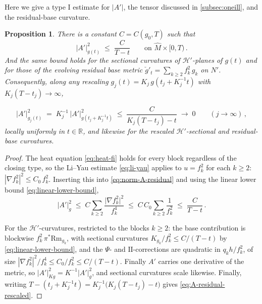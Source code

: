 \documentclass[11pt]{amsart}
\theoremstyle{plain}
\numberwithin{equation}{section}
\newtheorem{proposition}[theorem]{Proposition}
\theoremstyle{definition}
\theoremstyle{remark}
\begin{document}
Here we give a type I estimate for $|A'|$, the tensor discussed in \ref{subsec:oneill}, and the residual-base curvature.
\begin{proposition}\label{prop:A-residual-decay}
	There is a constant $C = C( g_0, T )$ such that
	\begin{equation}\label{eq:A-residual-typeI}
		\big| A' \big|^2_{g (t)} \;\leq\; \frac{C}{T - t} \qquad \text{on } \widehat{M} \times [0, T) \,.
	\end{equation}
	And the same bound holds for the sectional curvatures of $\mathcal{H}'$-planes of $g (t)$ and for those of the evolving residual base metric $\check{g}'_t = \sum_{k \geq 2} f_k^2\, g_k$ on $N'$. Consequently, along any rescaling $g_j (t) = K_j\, g ( t_j + K_j^{-1} t )$ with $K_j ( T - t_j ) \to \infty$,
	
	\begin{equation}\label{eq:A-residual-rescaled}
		\big| A' \big|^2_{g_j (t)} \;=\; K_j^{-1}\, \big| A' \big|^2_{g ( t_j + K_j^{-1} t )} \;\leq\; \frac{C}{K_j ( T - t_j ) - t} \;\longrightarrow\; 0 \qquad ( j \to \infty ) \,,
	\end{equation}
	locally uniformly in $t \in \mathbb{R}$, and likewise for the rescaled $\mathcal{H}'$-sectional and residual-base curvatures.
	
\end{proposition}

\begin{proof}
	The heat equation \eqref{eq:heat-fi} holds for every block regardless of the closing type, so the Li--Yau estimate \eqref{eq:li-yau} applies to $u = f_k^2$ for each $k \geq 2$: $| \nabla f_k^2 |^2 \leq C_0\, f_k^2$. Inserting this into \eqref{eq:norm-A-residual} and using the linear lower bound \eqref{eq:linear-lower-bound},
	\[
	\big| A' \big|^2_g \;\leq\; C \sum_{k \geq 2} \frac{\big| \nabla f_k^2 \big|^2}{f_k^4} \;\leq\; C\, C_0 \sum_{k \geq 2} \frac{1}{f_k^2} \;\leq\; \frac{C}{T - t} \,.
	\]
	
	For the $\mathcal{H}'$-curvatures, restricted to the blocks $k \geq 2$: the base contribution is blockwise $f_k^2\, \pi^* \mathrm{Rm}_{g_k}$, with sectional curvatures $K_{g_k} / f_k^2 \leq C / ( T - t )$ by \eqref{eq:linear-lower-bound}, and the $\Psi$- and $\mathrm{II}$-corrections are quadratic in $q_k h / f_k^2$, of size $| \nabla f_k^2 |^2 / f_k^4 \leq C_0 / f_k^2 \leq C / ( T - t )$. Finally $A'$ carries one derivative of the metric, so $| A' |^2_{K g} = K^{-1} | A' |^2_g$, and sectional curvatures scale likewise. Finally, writing $T - ( t_j + K_j^{-1} t ) = K_j^{-1} \big( K_j ( T - t_j ) - t \big)$ gives \eqref{eq:A-residual-rescaled}.
\end{proof}
\end{document}
